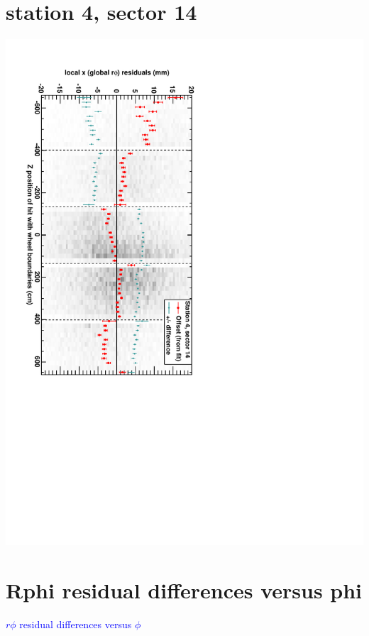 \documentclass[compress]{beamer}
\begin{document}
\section*{station 4, sector 14}
\begin{frame} \vfill \mbox{\hspace{-1 cm}\includegraphics[height=1.2\linewidth, angle=90]{DTrphiVsZ_st4_sr14.pdf}} \end{frame}

\section*{Rphi residual differences versus phi}
\begin{frame}
\begin{center}
\Huge \textcolor{blue}{$r\phi$ residual differences versus $\phi$}
\end{center}
\end{frame}
\end{document}
